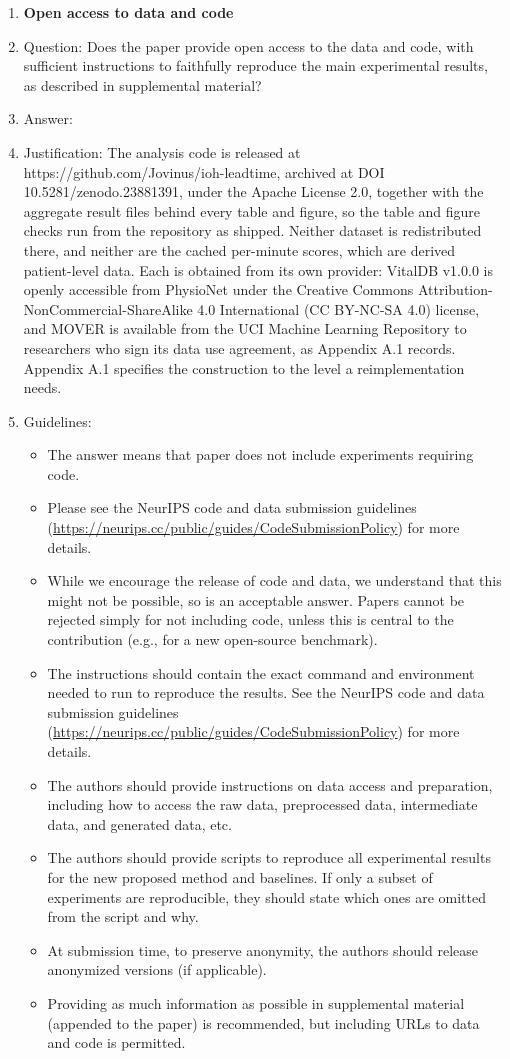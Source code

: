 \begin{enumerate}
\item {\bf Open access to data and code}
    \item[] Question: Does the paper provide open access to the data and code, with sufficient instructions to faithfully reproduce the main experimental results, as described in supplemental material?
    \item[] Answer: \answerYes{}
    \item[] Justification: The analysis code is released at https://github.com/Jovinus/ioh-leadtime, archived at DOI 10.5281/zenodo.23881391, under the Apache License 2.0, together with the aggregate result files behind every table and figure, so the table and figure checks run from the repository as shipped. Neither dataset is redistributed there, and neither are the cached per-minute scores, which are derived patient-level data. Each is obtained from its own provider: VitalDB v1.0.0 is openly accessible from PhysioNet under the Creative Commons Attribution-NonCommercial-ShareAlike 4.0 International (CC BY-NC-SA 4.0) license, and MOVER is available from the UCI Machine Learning Repository to researchers who sign its data use agreement, as Appendix A.1 records. Appendix A.1 specifies the construction to the level a reimplementation needs.
    \item[] Guidelines:
    \begin{itemize}
        \item The answer \answerNA{} means that paper does not include experiments requiring code.
        \item Please see the NeurIPS code and data submission guidelines (\url{https://neurips.cc/public/guides/CodeSubmissionPolicy}) for more details.
        \item While we encourage the release of code and data, we understand that this might not be possible, so \answerNo{} is an acceptable answer. Papers cannot be rejected simply for not including code, unless this is central to the contribution (e.g., for a new open-source benchmark).
        \item The instructions should contain the exact command and environment needed to run to reproduce the results. See the NeurIPS code and data submission guidelines (\url{https://neurips.cc/public/guides/CodeSubmissionPolicy}) for more details.
        \item The authors should provide instructions on data access and preparation, including how to access the raw data, preprocessed data, intermediate data, and generated data, etc.
        \item The authors should provide scripts to reproduce all experimental results for the new proposed method and baselines. If only a subset of experiments are reproducible, they should state which ones are omitted from the script and why.
        \item At submission time, to preserve anonymity, the authors should release anonymized versions (if applicable).
        \item Providing as much information as possible in supplemental material (appended to the paper) is recommended, but including URLs to data and code is permitted.
    \end{itemize}



\end{enumerate}
